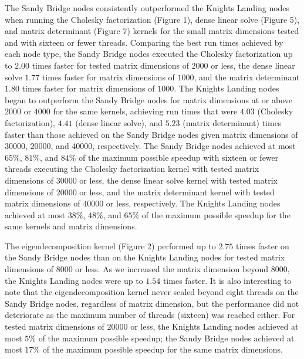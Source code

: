 The Sandy Bridge nodes consistently outperformed the Knights Landing nodes when
  running the Cholesky factorization (Figure 1), dense linear solve (Figure 5),
  and matrix determinant (Figure 7) kernels for the small matrix dimensions
  tested and with sixteen or fewer threads.
Comparing the best run times achieved by each node type, the Sandy Bridge nodes
  executed the Cholesky factorization up to $2.00$ times faster for tested
  matrix dimensions of $2000$ or less, the dense linear solve $1.77$ times
  faster for matrix dimensions of $1000$, and the matrix determinant $1.80$
  times faster for matrix dimensions of $1000$.
The Knights Landing nodes began to outperform the Sandy Bridge nodes for matrix
  dimensions at or above $2000$ or $4000$ for the same kernels, achieving run
  times that were $4.03$ (Cholesky factorization), $4.41$ (dense linear solve),
  and $5.23$ (matrix determinant) times faster than those achieved on the Sandy
  Bridge nodes given matrix dimensions of $30000$, $20000$, and $40000$,
  respectively.
The Sandy Bridge nodes achieved at most $65\%$, $81\%$, and $84\%$ of the
  maximum possible speedup with sixteen or fewer threads executing the Cholesky
  factorization kernel with tested matrix dimensions of $30000$ or less, the
  dense linear solve kernel with tested matrix dimensions of $20000$ or less,
  and the matrix determinant kernel with tested matrix dimensions of $40000$ or
  less, respectively.
The Knights Landing nodes achieved at most $38\%$, $48\%$, and $65\%$ of the
  maximum possible speedup for the same kernels and matrix dimensions.

The eigendecomposition kernel (Figure 2) performed up to $2.75$ times faster on
  the Sandy Bridge nodes than on the Knights Landing nodes for tested matrix
  dimensions of $8000$ or less.
As we increased the matrix dimension beyond $8000$, the Knights Landing nodes
  were up to $1.54$ times faster.
It is also interesting to note that the eigendecomposition kernel never scaled
  beyond eight threads on the Sandy Bridge nodes, regardless of matrix
  dimension, but the performance did not deteriorate as the maximum number of
  threads (sixteen) was reached either.
For tested matrix dimensions of $20000$ or less, the Knights Landing nodes
  achieved at most $5\%$ of the maximum possible speedup; the Sandy Bridge
  nodes achieved at most $17\%$ of the maximum possible speedup for the same
  matrix dimensions.

